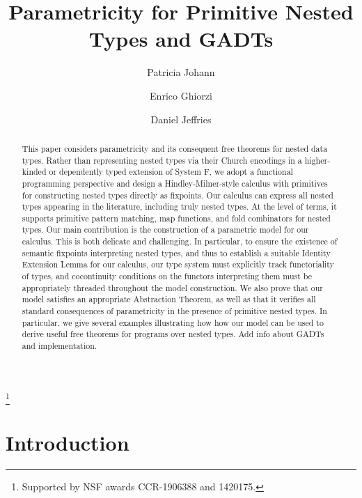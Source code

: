 \documentclass{lmcs}
\theoremstyle{plain}\newtheorem{satz}[thm]{Satz}
\begin{document}
\title[Parametricity for Primitive Nested Types and
  GADTs]{Parametricity for Primitive Nested Types and GADTs}

\author[P.~Johann]{Patricia Johann}	
\address{Appalachian State University}	
\thanks{Supported by NSF awards CCR-1906388 and 1420175.}

\author[E.~Ghiorzi]{Enrico Ghiorzi}	
\address{Appalachian State University}	

\author[D.~Jeffries]{Daniel Jeffries}	
\address{Appalachian State University}	

\begin{abstract}
This paper considers parametricity and its consequent free theorems
for nested data types. Rather than representing nested types via their
Church encodings in a higher-kinded or dependently typed extension of
System F, we adopt a functional programming perspective and design a
Hindley-Milner-style calculus with primitives for constructing nested
types directly as fixpoints. Our calculus can express all nested types
appearing in the literature, including truly nested types. At the
level of terms, it supports primitive pattern matching, map functions,
and fold combinators for nested types. Our main contribution is the
construction of a parametric model for our calculus. This is both
delicate and challenging. In particular, to ensure the existence of
semantic fixpoints interpreting nested types, and thus to establish a
suitable Identity Extension Lemma for our calculus, our type system
must explicitly track functoriality of types, and cocontinuity
conditions on the functors interpreting them must be appropriately
threaded throughout the model construction. We also prove that our
model satisfies an appropriate Abstraction Theorem, as well as that it
verifies all standard consequences of parametricity in the presence of
primitive nested types. In particular, we give several examples
illustrating how how our model can be used to derive useful free
theorems for programs over nested types. {\color{red} Add info about
  GADTs and implementation.}
\end{abstract}

\maketitle

\section{Introduction}\label{sec:intro}
\end{document}
